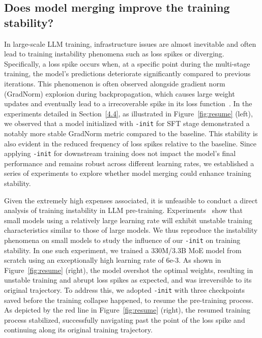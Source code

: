 \subsection{Does model merging improve the training stability?}
In large-scale LLM training, infrastructure issues are almost inevitable and often lead to training instability phenomena such as loss spikes or diverging.
Specifically, a loss spike occurs when, at a specific point during the multi-stage training, the model's predictions deteriorate significantly compared to previous iterations. 
This phenomenon is often observed alongside gradient norm (GradNorm) explosion during backpropagation, which causes large weight updates and eventually lead to a irrecoverable spike in its loss function~\cite{cohen2021gradient}. 
In the experiments detailed in Section~\ref{4.4}, as illustrated in Figure~\ref{fig:resume} (left), we observed that a model initialized with \texttt{\OURS{}-init} for SFT stage demonstrated a notably more stable GradNorm metric compared to the baseline. This stability is also evident in the reduced frequency of loss spikes relative to the baseline. 
Since applying \texttt{\OURS{}-init} for downstream training does not impact the model's final performance and remains robust across different learning rates, we established a series of experiments to explore whether model merging could enhance training stability. 

Given the extremely high expenses associated, it is unfeasible to conduct a direct analysis of training instability in LLM pre-training. 
Experiments~\cite{wortsman2023small} show that small models using a relatively large learning rate will exhibit unstable training characteristics similar to those of large models. 
We thus reproduce the instability phenomena on small models to study the influence of our \texttt{\OURS{}-init} on training stability.
In one such experiment, we trained a 330M/3.3B MoE model from scratch using an exceptionally high learning rate of 6e-3. 
As shown in Figure~\ref{fig:resume} (right), the model overshot the optimal weights, resulting in unstable training and abrupt loss spikes as expected, and was irreversible to its original trajectory. 
To address this, we adopted \texttt{\OURS{}-init} with three checkpoints saved before the training collapse happened, to resume the pre-training process. As depicted by the red line in Figure~\ref{fig:resume} (right), the resumed training process stabilized, successfully navigating past the point of the loss spike and continuing along its original training trajectory.

